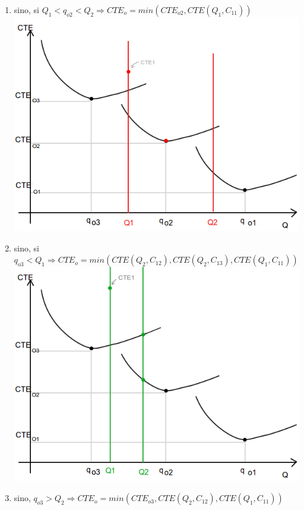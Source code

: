 \documentclass{article}
\begin{document}
\begin{enumerate}
 \item sino, si $ Q_1 < q_{o2} < Q_2 \Rightarrow CTE_o = min( CTE_{o2}, CTE(Q_1, C_{11})) $ \\
      \includegraphics[scale=0.5,keepaspectratio=true]{img/7/7_QvsCTE_3.png} 
 \item sino, si $q_{o3} < Q_1 \Rightarrow CTE_o = min( CTE(Q_2, C_{12}), CTE(Q_2, C_{13}), CTE(Q_1, C_{11})) $ \\
      \includegraphics[scale=0.5,keepaspectratio=true]{img/7/7_QvsCTE_4.png} 
 \item sino, $q_{o3} > Q_2 \Rightarrow CTE_o = min(CTE_{o3},CTE(Q_2, C_{12}), CTE(Q_1, C_{11}) ) $ \\

\end{enumerate}
\end{document}
